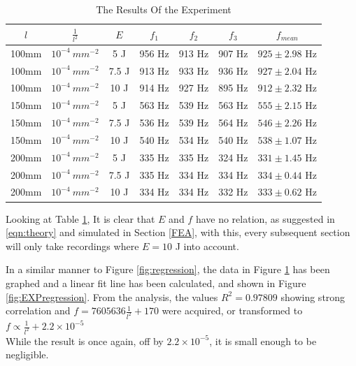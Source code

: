 \documentclass[a4paper,12pt]{article}
\begin{document}
    \begin{table}[H]%
    \begin{center}
    \begin{tabular}[H]{|c|c|c||c|c|c|c|}
    \hline
    $l$ & $\frac{1}{l^2}$ & $E$ & $f_1$ & $f_2$ & $f_3$ & $f_{mean}$  \\
    \hline\hline
    100mm & $10^{-4}~mm^{-2}$ & 5 J & 956 Hz & 913 Hz & 907 Hz & $925\pm2.98$ Hz \\
    \hline
    100mm & $10^{-4}~mm^{-2}$ & 7.5 J & 913 Hz & 933 Hz & 936 Hz & $927\pm2.04$ Hz \\
    \hline
    100mm & $10^{-4}~mm^{-2}$ & 10 J & 914 Hz & 927 Hz & 895 Hz &$912\pm2.32$ Hz \\
    \hline
    150mm & $10^{-4}~mm^{-2}$ & 5 J & 563 Hz & 539 Hz & 563 Hz &$555\pm2.15$ Hz \\
    \hline
    150mm & $10^{-4}~mm^{-2}$ & 7.5 J & 536 Hz & 539 Hz & 564 Hz &$546\pm2.26$ Hz \\
    \hline
    150mm & $10^{-4}~mm^{-2}$ & 10 J & 540 Hz & 534 Hz & 540 Hz &$538\pm1.07$ Hz \\
    \hline
    200mm & $10^{-4}~mm^{-2}$ & 5 J & 335 Hz & 335 Hz & 324 Hz &$331\pm1.45$ Hz \\
    \hline
    200mm & $10^{-4}~mm^{-2}$ & 7.5 J & 335 Hz & 334 Hz & 334 Hz &$334\pm0.44$ Hz \\
    \hline
    200mm & $10^{-4}~mm^{-2}$ & 10 J & 334 Hz & 334 Hz & 332 Hz &$333\pm0.62$ Hz \\
    \hline
    \end{tabular}
    \end{center}
    \caption{The Results Of the Experiment}\label{Tab:TableResults}
    \end{table}
    Looking at Table \ref{Tab:TableResults}, It is clear that $E$ and $f$ have no relation, as suggested in \eqref{eqn:theory} and simulated in Section \ref{FEA}, with this, every subsequent section will only take recordings where $E=10$ J into account.

    In a similar manner to Figure \ref{fig:regression}, the data in Figure \ref{Tab:TableResults} has been graphed and a linear fit line has been calculated, and shown in Figure \ref{fig:EXPregression}.
    From the analysis, the values $R^2=0.97809$ showing strong correlation and $f=7605636\frac{1}{l^{2}}+170$ were acquired, or transformed to $f\propto\frac{1}{l^{2}}+2.2\times10^{-5}$\\
    While the result is once again, off by $2.2\times10^{-5}$, it is small enough to be negligible.
\end{document}
